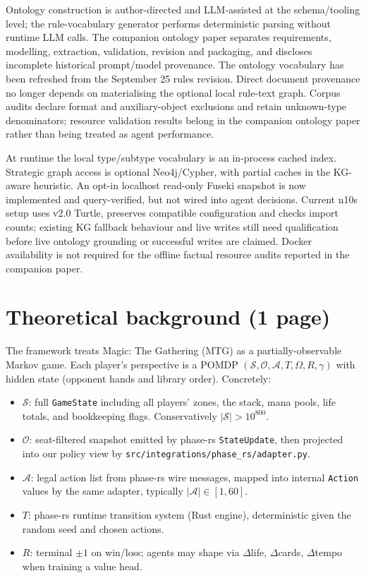 \documentclass[11pt,a4paper]{article}
\begin{document}
Ontology construction is author-directed and LLM-assisted at the schema/tooling
level; the rule-vocabulary generator performs deterministic parsing without
runtime LLM calls. The companion ontology paper separates requirements,
modelling, extraction, validation, revision and packaging, and discloses
incomplete historical prompt/model provenance.
The ontology vocabulary has been refreshed from the September 25 rules revision.
Direct document provenance no longer depends on materialising the optional
local rule-text graph. Corpus audits declare format and auxiliary-object
exclusions and retain unknown-type denominators; resource validation results
belong in the companion ontology paper rather than being treated as agent
performance.

At runtime the local type/subtype vocabulary is an in-process cached index.
Strategic graph access is optional Neo4j/Cypher, with partial caches in the
KG-aware heuristic. An opt-in localhost read-only Fuseki snapshot is now
implemented and query-verified, but not wired into agent decisions.
Current n10s setup uses v2.0 Turtle, preserves compatible configuration and
checks import counts; existing KG fallback behaviour and live writes still
need qualification before live
ontology grounding or successful writes are claimed. Docker availability is
not required for the offline factual resource audits reported in the companion
paper.

\section{Theoretical background (1 page)}
\label{sec:tech-theory}

The framework treats Magic: The Gathering (MTG) as a partially-observable
Markov game.  Each player's perspective is a POMDP
$(\mathcal{S},\mathcal{O},\mathcal{A},T,\Omega,R,\gamma)$ with hidden
state (opponent hands and library order).  Concretely:
%
\begin{itemize}[leftmargin=*]
  \item $\mathcal{S}$: full \texttt{GameState} including all players' zones, the
        stack, mana pools, life totals, and bookkeeping flags.  Conservatively
        $|\mathcal{S}| > 10^{800}$.
  \item $\mathcal{O}$: seat-filtered snapshot emitted by phase-rs
        \texttt{StateUpdate}, then projected into our policy view by
        \texttt{src/integrations/phase\_rs/adapter.py}.
  \item $\mathcal{A}$: legal action list from phase-rs wire messages,
        mapped into internal \texttt{Action} values by the same adapter,
        typically
        $|\mathcal{A}| \in [1, 60]$.
  \item $T$: phase-rs runtime transition system (Rust engine), deterministic
        given the random seed and chosen actions.
  \item $R$: terminal $\pm 1$ on win/loss; agents may shape via $\Delta$life,
        $\Delta$cards, $\Delta$tempo when training a value head.
\end{itemize}
\end{document}

